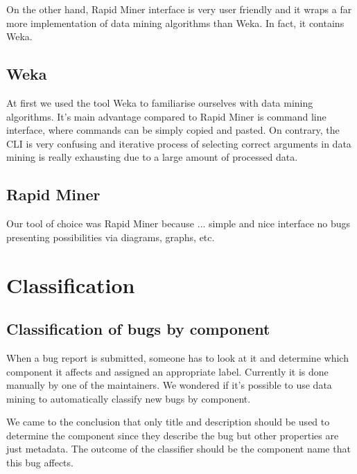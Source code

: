 On the other hand, Rapid Miner interface is very user friendly and it wraps a far more 
implementation of data mining algorithms than Weka. In fact, it contains Weka.

\subsection{Weka} %
\label{sub:Weka}

At first we used the tool Weka to familiarise ourselves with data mining algorithms.
It's main advantage compared to Rapid Miner is command line interface, where commands can be simply copied and pasted.
On contrary, the CLI is very confusing and iterative process of selecting correct arguments in data mining is really exhausting due to a large amount of processed data.



\subsection{Rapid Miner} %
\label{sub:Rapid Miner}

Our tool of choice was Rapid Miner because ...
simple and nice interface
no bugs
presenting possibilities via diagrams, graphs, etc.



\section{Classification} %
\label{sub:Classification}

\subsection{Classification of bugs by component} %
\label{sub:Classification of bugs bugs by component}

When a bug report is submitted, someone has to look at it and determine which component it affects and assigned an appropriate label. Currently it is done manually by one of the maintainers. We wondered if it's possible to use data mining to automatically classify new bugs by component.

We came to the conclusion that only title and description should be used to determine the component since they describe the bug but other properties are just metadata. The outcome of the classifier should be the component name that this bug affects.

